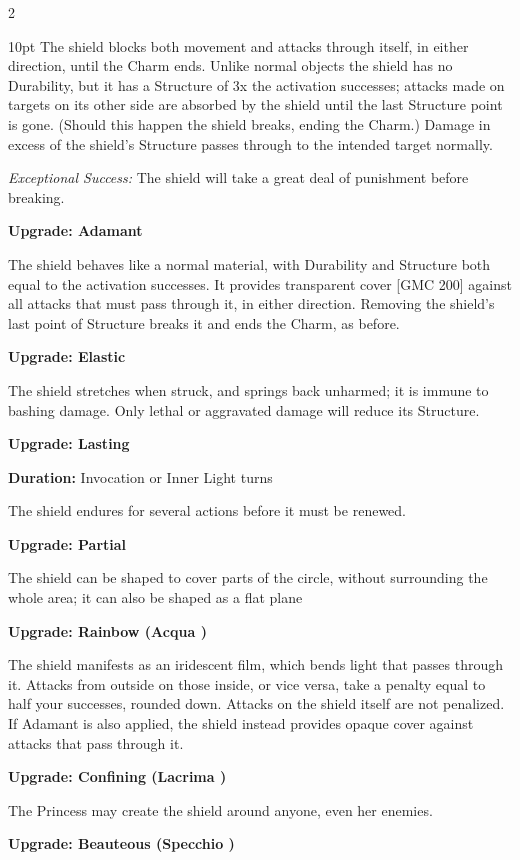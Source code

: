 \begin{multicols}{2}
\begin{myindentpar}{10pt}
The shield blocks both movement and attacks through itself, in either direction, until the Charm ends. Unlike normal objects the shield has no Durability, but it has a Structure of 3x the activation successes; attacks made on targets on its other side are absorbed by the shield until the last Structure point is gone. (Should this happen the shield breaks, ending the Charm.) Damage in excess of the shield’s Structure passes through to the intended target normally.

\emph{Exceptional Success:} The shield will take a great deal of punishment before breaking.

\textbf{Upgrade: Adamant}

The shield behaves like a normal material, with Durability and Structure both equal to the activation successes. It provides transparent cover [GMC 200] against all attacks that must pass through it, in either direction. Removing the shield’s last point of Structure breaks it and ends the Charm, as before.

\textbf{Upgrade: Elastic}

The shield stretches when struck, and springs back unharmed; it is immune to bashing damage. Only lethal or aggravated damage will reduce its Structure.

\textbf{Upgrade: Lasting}

\noindent \textbf{Duration:} Invocation or Inner Light turns

The shield endures for several actions before it must be renewed.

\textbf{Upgrade: Partial}

The shield can be shaped to cover parts of the circle, without surrounding the whole area; it can also be shaped as a flat plane

\textbf{Upgrade: Rainbow (Acqua \textbullet)}

The shield manifests as an iridescent film, which bends light that passes through it. Attacks from outside on those inside, or vice versa, take a penalty equal to half your successes, rounded down. Attacks on the shield itself are not penalized. If Adamant is also applied, the shield instead provides opaque cover against attacks that pass through it.

\textbf{Upgrade: Confining (Lacrima \textbullet)}

The Princess may create the shield around anyone, even her enemies.

\textbf{Upgrade: Beauteous (Specchio \textbullet)}


\end{myindentpar}
\end{multicols}
